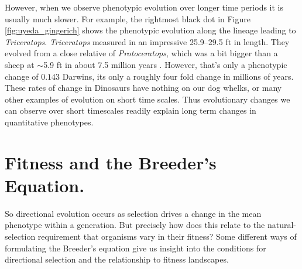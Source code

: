 However, when we observe phenotypic evolution over longer time periods
it is usually much
slower. For example, the rightmost black dot in Figure
\ref{fig:uyeda_gingerich} shows the phenotypic evolution along the
lineage leading to  {\it
  Triceratops}.   {\it Triceratops} measured in an impressive 25.9–29.5 ft in length. They evolved from a close
relative of {\it Protoceratops}, which was a bit bigger than a sheep
at $\sim$5.9 ft in about 7.5 million years
\citep{colbert1948evolution}. However, that's only a phenotypic change
of $0.143$ Darwins, its only a roughly four fold change in millions of
years. These rates of change in Dinosaurs have nothing on our dog
whelks, or many other examples of evolution on short time scales.    %
Thus evolutionary changes we can observe over short timescales 
readily explain long term changes in quantitative phenotypes. 


\section{Fitness and the Breeder's Equation.}
So directional evolution occurs as selection drives a change in
the mean phenotype within a generation. But precisely how does this relate to
the natural-selection requirement that organisms vary in their
fitness? Some different ways of formulating the Breeder's equation
give us insight into the conditions for directional selection and the
relationship to fitness landscapes.

